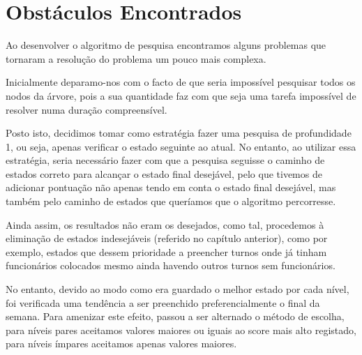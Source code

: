 \section{Obstáculos Encontrados}

Ao desenvolver o algoritmo de pesquisa encontramos alguns problemas que tornaram a resolução do problema um pouco mais complexa.

Inicialmente deparamo-nos com o facto de que seria impossível pesquisar todos os nodos da árvore, pois a sua quantidade faz com que seja uma tarefa impossível de resolver numa duração compreensível. 

Posto isto, decidimos tomar como estratégia fazer uma pesquisa de profundidade 1, ou seja, apenas verificar o estado seguinte ao atual. No entanto, ao utilizar essa estratégia, seria necessário fazer com que a pesquisa seguisse o caminho de estados correto para alcançar o estado final desejável, pelo que tivemos de adicionar pontuação não apenas tendo em conta o estado final desejável, mas também pelo caminho de estados que queríamos que o algoritmo percorresse. 

Ainda assim, os resultados não eram os desejados, como tal, procedemos à eliminação de estados indesejáveis (referido no capítulo anterior), como por exemplo, estados que dessem prioridade a preencher turnos onde já tinham funcionários colocados mesmo ainda havendo outros turnos sem funcionários.

No entanto, devido ao modo como era guardado o melhor estado por cada nível, foi verificada uma tendência a ser preenchido preferencialmente o final da semana. Para amenizar este efeito, passou a ser alternado o método de escolha, para níveis pares aceitamos valores maiores ou iguais ao score mais alto registado, para níveis ímpares aceitamos apenas valores maiores.